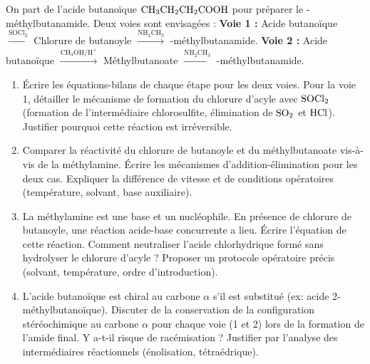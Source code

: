 \documentclass[11pt]{article}
\begin{document}
\begin{exercice}
On part de l'acide butanoïque $\ce{CH3CH2CH2COOH}$ pour préparer le -méthylbutanamide. Deux voies sont envisagées :
\textbf{Voie 1 :} Acide butanoïque $\xrightarrow{\text{SOCl}_2}$ Chlorure de butanoyle $\xrightarrow{\text{NH}_2\text{CH}_3}$ -méthylbutanamide.
\textbf{Voie 2 :} Acide butanoïque $\xrightarrow{\text{CH}_3\text{OH}/\text{H}^+}$ Méthylbutanoate $\xrightarrow{\text{NH}_2\text{CH}_3}$ -méthylbutanamide.
\begin{enumerate}
    \item Écrire les équations-bilans de chaque étape pour les deux voies. Pour la voie 1, détailler le mécanisme de formation du chlorure d'acyle avec $\ce{SOCl2}$ (formation de l'intermédiaire chlorosulfite, élimination de $\ce{SO2}$ et $\ce{HCl}$). Justifier pourquoi cette réaction est irréversible.
    \item Comparer la réactivité du chlorure de butanoyle et du méthylbutanoate vis-à-vis de la méthylamine. Écrire les mécanismes d'addition-élimination pour les deux cas. Expliquer la différence de vitesse et de conditions opératoires (température, solvant, base auxiliaire).
    \item La méthylamine est une base et un nucléophile. En présence de chlorure de butanoyle, une réaction acide-base concurrente a lieu. Écrire l'équation de cette réaction. Comment neutraliser l'acide chlorhydrique formé sans hydrolyser le chlorure d'acyle ? Proposer un protocole opératoire précis (solvant, température, ordre d'introduction).
    \item L'acide butanoïque est chiral au carbone $\alpha$ s'il est substitué (ex: acide 2-méthylbutanoïque). Discuter de la conservation de la configuration stéréochimique au carbone $\alpha$ pour chaque voie (1 et 2) lors de la formation de l'amide final. Y a-t-il risque de racémisation ? Justifier par l'analyse des intermédiaires réactionnels (énolisation, tétraédrique).
\end{enumerate}
\end{exercice}
\end{document}
